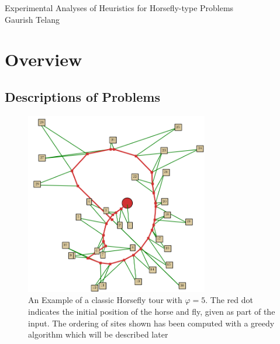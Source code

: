 \documentclass[11.5pt]{report}
\begin{document}
\begin{titlepage}
	\centering
        {\Huge Experimental Analyses of Heuristics for Horsefly-type Problems\\}
        \vspace{20mm}
        {\Large Gaurish Telang}
\end{titlepage}
\setcounter{page}{2} 

\setcounter{tocdepth}{1}
\tableofcontents
{}

\part{Overview}
\chapter{Descriptions of Problems}
\label{chap:descriptions-of-problems}


\begin{figure}[H]
  \centering

  \includegraphics[width=8cm]{../webs/docs/prelim_example_phi5.png}
  \caption{An Example of a classic Horsefly tour with $\varphi=5$. The red dot
    indicates the initial position of the horse and fly, given as part of 
    the input. The ordering of sites shown has been computed with a greedy 
    algorithm which will be described later}
  \label{fig:prelim-example}
\end{figure}
\end{document}
